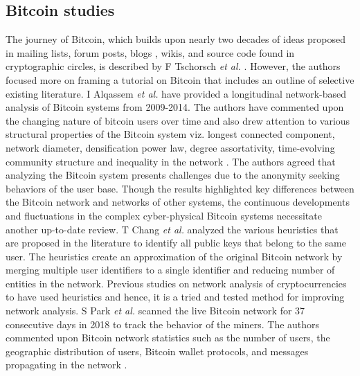 \documentclass[preprint,12pt]{elsarticle}
\begin{document}
\subsection{Bitcoin studies}
The journey of Bitcoin, which builds upon nearly two decades of ideas proposed in mailing lists, forum posts, blogs \cite{szabo_1970}, wikis, and source code found in cryptographic circles, is described by F Tschorsch \textit{et al.} \cite{tschorsch2016bitcoin}. However, the authors focused more on framing a tutorial on Bitcoin that includes an outline of selective existing literature. I Alqassem \textit{et al.} have provided a longitudinal network-based analysis of Bitcoin systems from 2009-2014. The authors have commented upon the changing nature of bitcoin users over time and also drew attention to various structural properties of the Bitcoin system viz. longest connected component, network diameter, densification power law, degree assortativity, time-evolving community structure and inequality in the network \cite{alqassem2018anti}. The authors agreed that analyzing the Bitcoin system presents challenges due to the anonymity seeking behaviors of the user base. Though the results highlighted key differences between the Bitcoin network and networks of other systems, the continuous developments and fluctuations in the complex cyber-physical Bitcoin systems necessitate another up-to-date review. T Chang \textit{et al.} analyzed the various heuristics that are proposed in the literature to identify all public keys that belong to the same user. The heuristics create an approximation of the original Bitcoin network by merging multiple user identifiers to a single identifier and reducing number of entities in the network. Previous studies on network analysis of cryptocurrencies \cite{alqassem2018anti, lee2019measurements, toyoda2019novel} to have used heuristics and hence, it is a tried and tested method for improving network analysis. S Park \textit{et al.} scanned the live Bitcoin network for 37 consecutive days in 2018 to track the behavior of the miners. The authors commented upon Bitcoin network statistics such as the number of users, the geographic distribution of users, Bitcoin wallet protocols, and messages propagating in the network \cite{park2019nodes}. 
\end{document}
